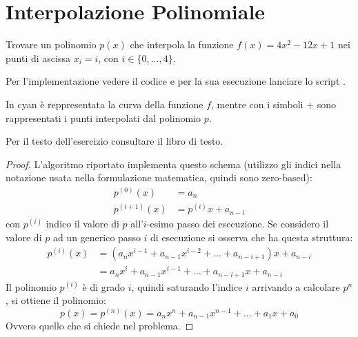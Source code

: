 \section{Interpolazione Polinomiale} 

\begin{exercise}[4.1] 
Trovare un polinomio $p(x)$ che interpola la funzione $f(x) = 4x^{2} -12x +1$
nei punti di ascissa $x_{i} = i$, con $ i \in \{ 0,\ldots, 4 \}$.
\end{exercise}
Per l'implementazione vedere il codice  e per la 
sua esecuzione lanciare lo script .
\begin{center} 

\end{center}
In cyan \`e reppresentata la curva della funzione $f$, mentre con i simboli
$+$ sono rappresentati i punti interpolati dal polinomio $p$.

\begin{exercise}[4.2] 
Per il testo dell'esercizio consultare il libro di testo.
\end{exercise}
\begin{proof}
L'algoritmo riportato implementa questo schema (utilizzo gli indici nella
notazione usata nella formulazione matematica, quindi sono zero-based):
\begin{displaymath}
\begin{split}
	p^{(0)}(x) &= a_{n} \\
	p^{(i+1)}(x) &= p^{(i)}x + a_{n-i} 
\end{split}
\end{displaymath}
con $p^{(i)}$ indico il valore di $p$ all'$i$-esimo passo dei esecuzione. 
Se considero il valore di $p$ ad un generico passo $i$ di esecuzione si
osserva che ha questa struttura:
\begin{displaymath}
\begin{split}
	p^{(i)}(x) &= (a_{n}x^{i-1} + a_{n-1}x^{i-2} + \ldots + a_{n-i+1})x + a_{n-i}\\
	&= a_{n}x^{i} + a_{n-1}x^{i-1} + \ldots + a_{n-i+1}x + a_{n-i}
\end{split}
\end{displaymath}
Il polinomio $p^{(i)}$ \`e di grado $i$, quindi saturando l'indice $i$ arrivando
a calcolare $p^{n}$, si ottiene il polinomio:
\begin{displaymath}
	p(x) = p^{(n)}(x) = a_{n}x^{n} + a_{n-1}x^{n-1} + \ldots + a_{1}x + a_{0}
\end{displaymath}
Ovvero quello che si chiede nel problema.
\end{proof}

